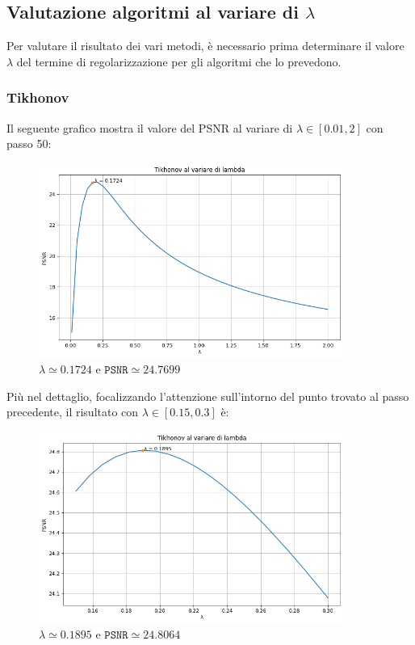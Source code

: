\documentclass[11pt]{article}
\begin{document}
\subsection*{Valutazione algoritmi al variare di $\lambda$}
Per valutare il risultato dei vari metodi, è necessario prima determinare il valore $\lambda$ del termine di regolarizzazione per gli algoritmi che lo prevedono.
\subsubsection*{Tikhonov}
Il seguente grafico mostra il valore del PSNR al variare di $\lambda \in [0.01, 2]$ con passo 50:
\begin{figure}[H]
    \centering
    \includegraphics[width=10cm]{tikhonov_lambda1.png}
    \caption{$\lambda \simeq 0.1724$ e $\texttt{PSNR} \simeq 24.7699$}
    \label{fig:tikhonov_lambda1}
\end{figure}
Più nel dettaglio, focalizzando l'attenzione sull'intorno del punto trovato al passo precedente, il risultato con $\lambda \in [0.15, 0.3]$ è:
\begin{figure}[H]
    \centering
    \includegraphics[width=10cm]{tikhonov_lambda2.png}
    \caption{$\lambda \simeq 0.1895$ e $\texttt{PSNR} \simeq 24.8064$}
    \label{fig:tikhonov_lambda2}
\end{figure}
\end{document}
